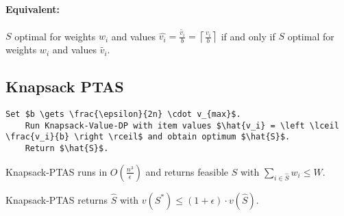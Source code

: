 \paragraph{Equivalent:} $S$ optimal for weights $w_i$ and values $\hat{v_i} = \frac{\tilde{v_i}}{b} = \left \lceil \frac{v_i}{b} \right \rceil$ if and only if $S$ optimal for weights $w_i$ and values $\tilde{v_i}$.

\subsection{Knapsack PTAS}

\begin{lstlisting}[mathescape]
	Set $b \gets \frac{\epsilon}{2n} \cdot v_{max}$.
	Run Knapsack-Value-DP with item values $\hat{v_i} = \left \lceil \frac{v_i}{b} \right \rceil$ and obtain optimum $\hat{S}$.
	Return $\hat{S}$.
\end{lstlisting}

\begin{mytheorem}
Knapsack-PTAS runs in $O(\frac{n^3}{\epsilon})$ and returns feasible $\hat{S}$ with $\sum\limits_{i \in \hat{S}} w_i \le W$.	
\end{mytheorem}

\begin{mytheorem}
Knapsack-PTAS returns $\hat{S}$ with $v(S^*) \le (1+\epsilon) \cdot v(\hat{S})$.	
\end{mytheorem}


